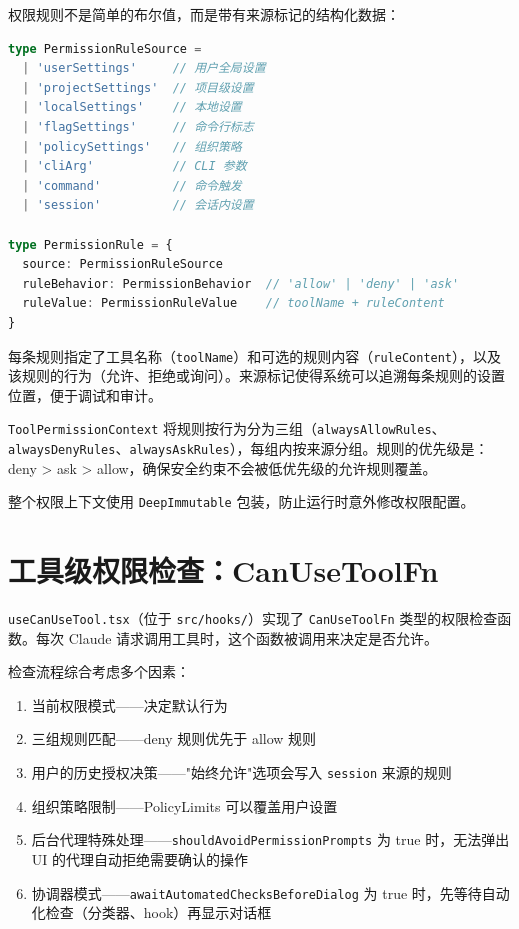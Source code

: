 权限规则不是简单的布尔值，而是带有来源标记的结构化数据：

\begin{lstlisting}[language=TypeScript]
type PermissionRuleSource =
  | 'userSettings'     // 用户全局设置
  | 'projectSettings'  // 项目级设置
  | 'localSettings'    // 本地设置
  | 'flagSettings'     // 命令行标志
  | 'policySettings'   // 组织策略
  | 'cliArg'           // CLI 参数
  | 'command'          // 命令触发
  | 'session'          // 会话内设置

type PermissionRule = {
  source: PermissionRuleSource
  ruleBehavior: PermissionBehavior  // 'allow' | 'deny' | 'ask'
  ruleValue: PermissionRuleValue    // toolName + ruleContent
}
\end{lstlisting}

每条规则指定了工具名称（\texttt{toolName}）和可选的规则内容（\texttt{ruleContent}），以及该规则的行为（允许、拒绝或询问）。来源标记使得系统可以追溯每条规则的设置位置，便于调试和审计。

\texttt{ToolPermissionContext} 将规则按行为分为三组（\texttt{alwaysAllowRules}、\texttt{alwaysDenyRules}、\texttt{alwaysAskRules}），每组内按来源分组。规则的优先级是：deny > ask > allow，确保安全约束不会被低优先级的允许规则覆盖。

整个权限上下文使用 \texttt{DeepImmutable} 包装，防止运行时意外修改权限配置。

\section{工具级权限检查：CanUseToolFn}

\texttt{useCanUseTool.tsx}（位于 \texttt{src/hooks/}）实现了 \texttt{CanUseToolFn} 类型的权限检查函数。每次 Claude 请求调用工具时，这个函数被调用来决定是否允许。

检查流程综合考虑多个因素：

\begin{enumerate}
  \item 当前权限模式——决定默认行为
  \item 三组规则匹配——deny 规则优先于 allow 规则
  \item 用户的历史授权决策——"始终允许"选项会写入 \texttt{session} 来源的规则
  \item 组织策略限制——PolicyLimits 可以覆盖用户设置
  \item 后台代理特殊处理——\texttt{shouldAvoidPermissionPrompts} 为 true 时，无法弹出 UI 的代理自动拒绝需要确认的操作
  \item 协调器模式——\texttt{awaitAutomatedChecksBeforeDialog} 为 true 时，先等待自动化检查（分类器、hook）再显示对话框
\end{enumerate}

